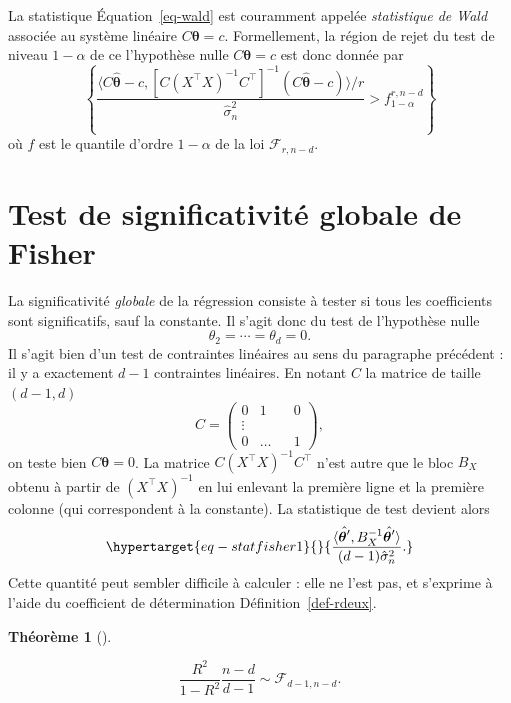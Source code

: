 \documentclass[
  10,
  letterpaper,
  DIV=11,
  numbers=noendperiod]{scrreport}
\newcommand{\bt}{\boldsymbol{\theta}}
\theoremstyle{plain}
\newtheorem{theorem}{Théorème}[chapter]
\theoremstyle{definition}
\theoremstyle{plain}
\theoremstyle{definition}
\theoremstyle{definition}
\theoremstyle{plain}
\theoremstyle{remark}
\begin{document}
La statistique Équation~\ref{eq-wald} est couramment appelée
\emph{statistique de Wald} associée au système linéaire \(C\bt = c\).
Formellement, la région de rejet du test de niveau \(1-\alpha\) de ce
l'hypothèse nulle \(C\bt = c\) est donc donnée par
\[\left\lbrace \frac{\langle C\hat{\bt}-c, [C(X^\top X)^{-1}C^\top]^{-1} (C\hat{\bt}-c)\rangle /r}{\hat{\sigma}_n^2}  > f^{r,n-d}_{1-\alpha} \right\rbrace\]
où \(f\) est le quantile d'ordre \(1-\alpha\) de la loi
\(\mathscr{F}_{r,n-d}\).

\hypertarget{test-de-significativituxe9-globale-de-fisher}{%
\section{Test de significativité globale de
Fisher}\label{test-de-significativituxe9-globale-de-fisher}}

La significativité \emph{globale} de la régression consiste à tester si
tous les coefficients sont significatifs, sauf la constante. Il s'agit
donc du test de l'hypothèse nulle \[ \theta_2 = \dotsb = \theta_d = 0.\]
Il s'agit bien d'un test de contraintes linéaires au sens du paragraphe
précédent : il y a exactement \(d-1\) contraintes linéaires. En notant
\(C\) la matrice de taille \((d-1, d)\)
\[C = \begin{pmatrix}0 & 1 && 0 \\ \vdots \\ 0 & \dots && 1 \end{pmatrix}, \]
on teste bien \(C\bt = 0\). La matrice \(C(X^\top X)^{-1}C^\top\) n'est
autre que le bloc \(B_X\) obtenu à partir de \((X^\top X)^{-1}\) en lui
enlevant la première ligne et la première colonne (qui correspondent à
la constante). La statistique de test devient alors
\begin{equation}\protect\hypertarget{eq-statfisher1}{}{ \frac{\langle \hat{\bt'}, B_X^{-1} \hat{\bt'} \rangle}{(d-1)\hat{\sigma}^2_n}.}\label{eq-statfisher1}\end{equation}
Cette quantité peut sembler difficile à calculer : elle ne l'est pas, et
s'exprime à l'aide du coefficient de détermination
Définition~\ref{def-rdeux}.

\begin{theorem}[]\protect\hypertarget{thm-fisher-sig}{}\label{thm-fisher-sig}

\[\frac{R^2}{1-R^2}\frac{n-d}{d-1} \sim \mathscr{F}_{d-1, n-d}. \]

\end{theorem}
\end{document}
